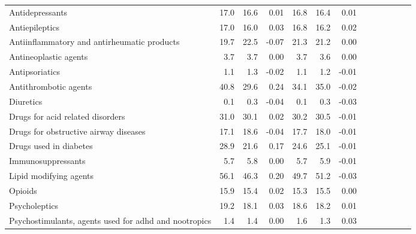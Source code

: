 \documentclass[11pt,]{article}
\begin{document}
\begin{longtable}{lrrrrrrrrrrrr}
      Antidepressants & 17.0 & 16.6 &  0.01 & 16.8 & 16.4 &  0.01 \\ 
      Antiepileptics & 17.0 & 16.0 &  0.03 & 16.8 & 16.2 &  0.02 \\ 
      Antiinflammatory and antirheumatic products & 19.7 & 22.5 & -0.07 & 21.3 & 21.2 &  0.00 \\ 
      Antineoplastic agents &  3.7 &  3.7 &  0.00 &  3.7 &  3.6 &  0.00 \\ 
      Antipsoriatics &  1.1 &  1.3 & -0.02 &  1.1 &  1.2 & -0.01 \\ 
      Antithrombotic agents & 40.8 & 29.6 &  0.24 & 34.1 & 35.0 & -0.02 \\ 
      Diuretics &  0.1 &  0.3 & -0.04 &  0.1 &  0.3 & -0.03 \\ 
      Drugs for acid related disorders & 31.0 & 30.1 &  0.02 & 30.2 & 30.5 & -0.01 \\ 
      Drugs for obstructive airway diseases & 17.1 & 18.6 & -0.04 & 17.7 & 18.0 & -0.01 \\ 
      Drugs used in diabetes & 28.9 & 21.6 &  0.17 & 24.6 & 25.1 & -0.01 \\ 
      Immunosuppressants &  5.7 &  5.8 &  0.00 &  5.7 &  5.9 & -0.01 \\ 
      Lipid modifying agents & 56.1 & 46.3 &  0.20 & 49.7 & 51.2 & -0.03 \\ 
      Opioids & 15.9 & 15.4 &  0.02 & 15.3 & 15.5 &  0.00 \\ 
      Psycholeptics & 19.2 & 18.1 &  0.03 & 18.6 & 18.2 &  0.01 \\ 
      Psychostimulants, agents used for adhd and nootropics &  1.4 &  1.4 &  0.00 &  1.6 &  1.3 &  0.03 \\ 
   \bottomrule\end{longtable}
\clearpage
{}
\end{document}
